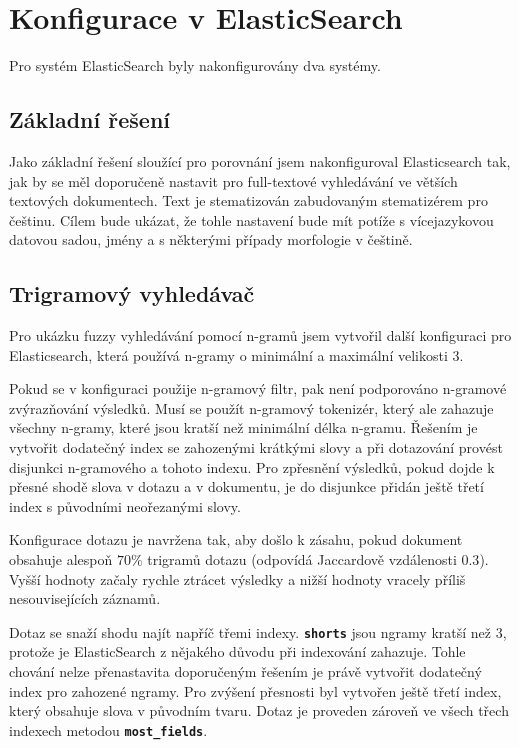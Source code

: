 \documentclass[11pt,letterpaper,oneside,openright]{book}
\newcommand{\bftt}[1]{\texttt{\textbf{#1}}}
\begin{document}
\section{Konfigurace v ElasticSearch}
Pro systém ElasticSearch byly nakonfigurovány dva systémy.

\subsection{Základní řešení}
Jako základní řešení sloužící pro porovnání jsem nakonfiguroval Elasticsearch
tak, jak by se měl doporučeně nastavit pro full-textové vyhledávání ve větších
textových dokumentech. Text je stematizován zabudovaným stematizérem pro
češtinu. Cílem bude ukázat, že tohle nastavení bude mít potíže s vícejazykovou
datovou sadou, jmény a s některými případy morfologie v češtině.

\subsection{Trigramový vyhledávač}
Pro ukázku fuzzy vyhledávání pomocí n-gramů jsem vytvořil další konfiguraci pro
Elasticsearch, která používá n-gramy o minimální a maximální velikosti 3.

Pokud se v konfiguraci použije n-gramový filtr, pak není podporováno n-gramové
zvýrazňování výsledků. Musí se použít n-gramový tokenizér, který ale zahazuje
všechny n-gramy, které jsou kratší než minimální délka n-gramu. Řešením je
vytvořit dodatečný index se zahozenými krátkými slovy a při dotazování provést
disjunkci n-gramového a tohoto indexu. Pro zpřesnění výsledků, pokud dojde k
přesné shodě slova v dotazu a v dokumentu, je do disjunkce přidán ještě třetí
index s původními neořezanými slovy.

Konfigurace dotazu je navržena tak, aby došlo k zásahu, pokud dokument obsahuje
alespoň $70\%$ trigramů dotazu (odpovídá Jaccardově vzdálenosti $0.3$). Vyšší
hodnoty začaly rychle ztrácet výsledky a nižší hodnoty vracely příliš
nesouvisejících záznamů.

Dotaz se snaží shodu najít napříč třemi indexy. \bftt{shorts} jsou ngramy
kratší než $3$, protože je ElasticSearch z nějakého důvodu při indexování
zahazuje. Tohle chování nelze přenastavita doporučeným řešením je právě
vytvořit dodatečný index pro zahozené ngramy. Pro zvýšení přesnosti byl
vytvořen ještě třetí index, který obsahuje slova v původním tvaru. Dotaz je
proveden zároveň ve všech třech indexech metodou \bftt{most\_fields}.
\end{document}
